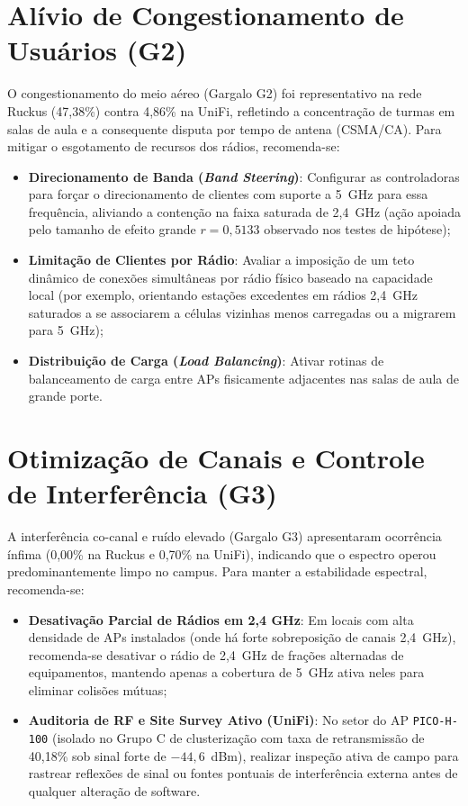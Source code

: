 \section{Alívio de Congestionamento de Usuários (G2)}
\label{sec:recomendacoes_g2}

O congestionamento do meio aéreo (Gargalo G2) foi representativo na rede Ruckus (47,38\%) contra 4,86\% na UniFi, refletindo a concentração de turmas em salas de aula e a consequente disputa por tempo de antena (CSMA/CA). Para mitigar o esgotamento de recursos dos rádios, recomenda-se:
\begin{itemize}
	\item \textbf{Direcionamento de Banda (\textit{Band Steering})}: Configurar as controladoras para forçar o direcionamento de clientes com suporte a 5~GHz para essa frequência, aliviando a contenção na faixa saturada de 2,4~GHz (ação apoiada pelo tamanho de efeito grande $r = 0,5133$ observado nos testes de hipótese);
	\item \textbf{Limitação de Clientes por Rádio}: Avaliar a imposição de um teto dinâmico de conexões simultâneas por rádio físico baseado na capacidade local (por exemplo, orientando estações excedentes em rádios 2,4~GHz saturados a se associarem a células vizinhas menos carregadas ou a migrarem para 5~GHz);
	\item \textbf{Distribuição de Carga (\textit{Load Balancing})}: Ativar rotinas de balanceamento de carga entre APs fisicamente adjacentes nas salas de aula de grande porte.
\end{itemize}

\section{Otimização de Canais e Controle de Interferência (G3)}
\label{sec:recomendacoes_g3}

A interferência co-canal e ruído elevado (Gargalo G3) apresentaram ocorrência ínfima (0,00\% na Ruckus e 0,70\% na UniFi), indicando que o espectro operou predominantemente limpo no campus. Para manter a estabilidade espectral, recomenda-se:
\begin{itemize}
	\item \textbf{Desativação Parcial de Rádios em 2,4 GHz}: Em locais com alta densidade de APs instalados (onde há forte sobreposição de canais 2,4~GHz), recomenda-se desativar o rádio de 2,4~GHz de frações alternadas de equipamentos, mantendo apenas a cobertura de 5~GHz ativa neles para eliminar colisões mútuas;
	\item \textbf{Auditoria de RF e Site Survey Ativo (UniFi)}: No setor do AP \texttt{PICO-H-100} (isolado no Grupo C de clusterização com taxa de retransmissão de 40,18\% sob sinal forte de $-44,6$~dBm), realizar inspeção ativa de campo para rastrear reflexões de sinal ou fontes pontuais de interferência externa antes de qualquer alteração de software.
\end{itemize}

